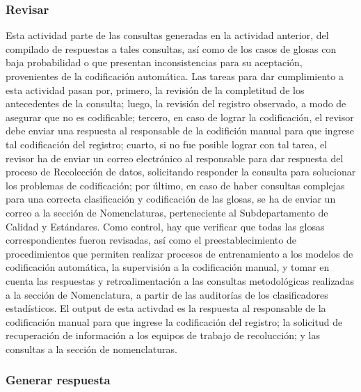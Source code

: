 \documentclass[
]{article}
\begin{document}
\hypertarget{revisar}{%
\subsubsection{Revisar}\label{revisar}}

Esta actividad parte de las consultas generadas en la actividad anterior, del compilado de respuestas a tales consultas, así como de los casos de glosas con baja probabilidad o que presentan inconsistencias para su aceptación, provenientes de la codificación automática. Las tareas para dar cumplimiento a esta actividad pasan por, primero, la revisión de la completitud de los antecedentes de la consulta; luego, la revisión del registro observado, a modo de asegurar que no es codificable; tercero, en caso de lograr la codificación, el revisor debe enviar una respuesta al responsable de la codifición manual para que ingrese tal codificación del registro; cuarto, si no fue posible lograr con tal tarea, el revisor ha de enviar un correo electrónico al responsable para dar respuesta del proceso de Recolección de datos, solicitando responder la consulta para solucionar los problemas de codificación; por último, en caso de haber consultas complejas para una correcta clasificación y codificación de las glosas, se ha de enviar un correo a la sección de Nomenclaturas, perteneciente al Subdepartamento de Calidad y Estándares. Como control, hay que verificar que todas las glosas correspondientes fueron revisadas, así como el preestablecimiento de procedimientos que permiten realizar procesos de entrenamiento a los modelos de codificación automática, la supervisión a la codificación manual, y tomar en cuenta las respuestas y retroalimentación a las consultas metodológicas realizadas a la sección de Nomenclatura, a partir de las auditorías de los clasificadores estadísticos. El output de esta activdad es la respuesta al responsable de la codificación manual para que ingrese la codificación del registro; la solicitud de recuperación de información a los equipos de trabajo de recolucción; y las consultas a la sección de nomenclaturas.

\hypertarget{generar-respuesta}{%
\subsubsection{Generar respuesta}\label{generar-respuesta}}
\end{document}
